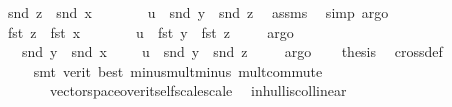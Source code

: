 \begin{isabellebody}
\ {}{\isacharcolon}{\kern0pt}\ {\isachardoublequoteopen}snd\ z\ {\isacharminus}{\kern0pt}\ snd\ x\ {\isacharequal}{\kern0pt}\ \ \ \ \ \ {\isacharminus}{\kern0pt}\ u\ {\isacharasterisk}{\kern0pt}\ {\isacharparenleft}{\kern0pt}snd\ y\ {\isacharminus}{\kern0pt}\ snd\ z{\isacharparenright}{\kern0pt}{\isachardoublequoteclose}\ \isamarkupfalse%
\ assms\ \isamarkupfalse%
\ {\isacharparenleft}{\kern0pt}simp{\isacharcomma}{\kern0pt}\ argo{\isacharparenright}{\kern0pt}\isanewline
\ \ \isamarkupfalse%
\ {}{\isacharcolon}{\kern0pt}\ {\isachardoublequoteopen}fst\ z\ {\isacharminus}{\kern0pt}\ fst\ x\ {\isacharequal}{\kern0pt}\ \ \ \ \ \ {\isacharminus}{\kern0pt}\ u\ {\isacharasterisk}{\kern0pt}\ {\isacharparenleft}{\kern0pt}fst\ y\ {\isacharminus}{\kern0pt}\ fst\ z{\isacharparenright}{\kern0pt}{\isachardoublequoteclose}\ \isamarkupfalse%
\ {}\ \isamarkupfalse%
\ argo\isanewline
\ \ \isamarkupfalse%
\ \ \ \ {\isachardoublequoteopen}snd\ y\ {\isacharminus}{\kern0pt}\ snd\ x\ {\isacharequal}{\kern0pt}\ \ {\isacharparenleft}{\kern0pt}{}\ {\isacharminus}{\kern0pt}\ u{\isacharparenright}{\kern0pt}\ {\isacharasterisk}{\kern0pt}\ {\isacharparenleft}{\kern0pt}snd\ y\ {\isacharminus}{\kern0pt}\ snd\ z{\isacharparenright}{\kern0pt}{\isachardoublequoteclose}\ \isamarkupfalse%
\ {}\ \isamarkupfalse%
\ argo\isanewline
\ \ \isamarkupfalse%
\ {\isacharquery}{\kern0pt}thesis\ \isamarkupfalse%
\ cross{}{\isacharunderscore}{\kern0pt}def\ \isamarkupfalse%
\ {}\ {}\ {}\ \isanewline
\ \ \ \ \isamarkupfalse%
\ {\isacharparenleft}{\kern0pt}smt\ {\isacharparenleft}{\kern0pt}verit{\isacharcomma}{\kern0pt}\ best{\isacharparenright}{\kern0pt}\ minus{\isacharunderscore}{\kern0pt}mult{\isacharunderscore}{\kern0pt}minus\ mult{\isachardot}{\kern0pt}commute\isanewline
\ \ \ \ \ \ \ \ vector{\isacharunderscore}{\kern0pt}space{\isacharunderscore}{\kern0pt}over{\isacharunderscore}{\kern0pt}itself{\isachardot}{\kern0pt}scale{\isacharunderscore}{\kern0pt}scale{\isacharparenright}{\kern0pt}\ \isanewline
{}\isamarkupfalse%
%
\endisatagproof
{\isafoldproof}%
%
\isadelimproof
\isanewline
%
\endisadelimproof
\isanewline
{}\isamarkupfalse%
\ in{\isacharunderscore}{\kern0pt}hull{}{\isacharunderscore}{\kern0pt}iscollinear{\isacharcolon}{\kern0pt}\ \isanewline

\end{isabellebody}
